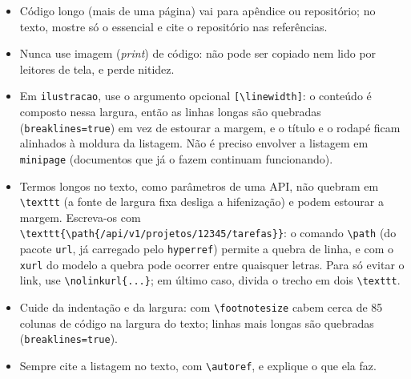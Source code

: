\begin{itemize}
  \item Código longo (mais de uma página) vai para apêndice ou repositório; no texto, mostre
        só o essencial e cite o repositório nas referências.
  \item Nunca use imagem (\emph{print}) de código: não pode ser copiado nem lido por leitores
        de tela, e perde nitidez.
  \item Em \texttt{ilustracao}, use o argumento opcional \texttt{[\textbackslash linewidth]}: o
        conteúdo é composto nessa largura, então as linhas longas são quebradas
        (\texttt{breaklines=true}) em vez de estourar a margem, e o título e o rodapé
        ficam alinhados à moldura da listagem. Não é preciso envolver a listagem em
        \texttt{minipage} (documentos que já o fazem continuam funcionando).
  \item Termos longos no texto, como parâmetros de uma API, não quebram em \texttt{\textbackslash texttt}
        (a fonte de largura fixa desliga a hifenização) e podem estourar a margem. Escreva-os
        com \texttt{\textbackslash texttt\{\textbackslash path\{/api/v1/projetos/12345/tarefas\}\}}:
        o comando \texttt{\textbackslash path} (do pacote \texttt{url}, já carregado pelo
        \texttt{hyperref}) permite a quebra de linha, e com o \texttt{xurl} do modelo a
        quebra pode ocorrer entre quaisquer letras. Para só evitar o link, use
        \texttt{\textbackslash nolinkurl\{...\}}; em último caso, divida o trecho em dois
        \texttt{\textbackslash texttt}.
  \item Cuide da indentação e da largura: com \texttt{\textbackslash footnotesize} cabem cerca de
        85 colunas de código na largura do texto; linhas mais longas são quebradas
        (\texttt{breaklines=true}).
  \item Sempre cite a listagem no texto, com \texttt{\textbackslash autoref}, e explique o que
        ela faz.
\end{itemize}
